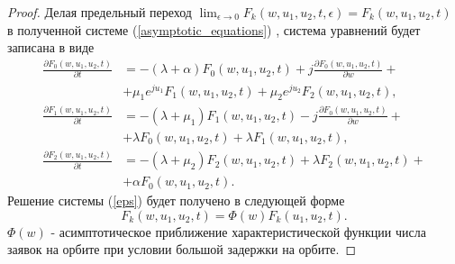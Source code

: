 \begin{proof}
 Делая предельный переход $ \lim_{\epsilon \xrightarrow{} 0} F_{k}(w,u_{1},u_{2},t,\epsilon) = F_{k}(w,u_{1},u_{2},t)$  в полученной системе (\ref{asymptotic_equations}) , система уравнений будет записана в виде
	\begin{equation} \label{eps}
		\begin{split}
			\frac{{\partial F_{0}(w,u_{1},u_{2},t)}}{{\partial t}} &= -(\lambda + \alpha)F_{0}(w,u_{1},u_{2},t) + j
			\frac{{\partial F_{0}(w,u_{1},u_{2},t)}}{{\partial w}} +\\  &+ \mu_{1} e^{ju_{1}}F_{1}(w,u_{1},u_{2},t) + \mu_{2}e^{ju_{2}}F_{2}(w,u_{1},u_{2},t) ,
			\\
			\frac{{\partial F_{1}(w,u_{1},u_{2},t)}}{{\partial t}} &= -(\lambda + \mu_{1})F_{1}(w,u_{1},u_{2},t) - j 
			\frac{{\partial F_{0}(w,u_{1},u_{2},t)}}{{\partial w}} +\\  &+ \lambda F_{0}(w,u_{1},u_{2},t) + \lambda F_{1}(w,u_{1},u_{2},t) ,
			\\
			\frac{{\partial F_{2}(w,u_{1},u_{2},t)}}{{\partial t}} &= -(\lambda + \mu_{2})F_{2}(w,u_{1},u_{2},t)  + \lambda F_{2}(w,u_{1},u_{2},t) +\\  &+ \alpha F_{0}(w,u_{1},u_{2},t).
		\end{split}
	\end{equation}  
Решение системы (\ref{eps}) будет получено в следующей форме
\begin{equation} \label{sol}
F_{k}(w,u_{1},u_{2},t) = \Phi(w)F_{k}(u_{1},u_{2},t).
\end{equation}  
$\Phi(w)$ - асимптотическое приближение характеристической функции числа заявок на орбите при условии большой задержки на орбите.


\end{proof}
